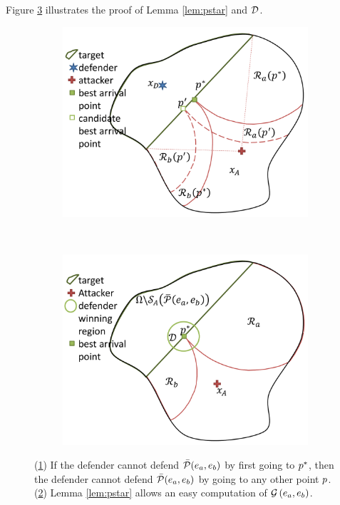 Figure \ref{fig:lemma2} illustrates the proof of Lemma \ref{lem:pstar} and $\mathcal{D}$.
\begin{figure}[h]
\centering
	\begin{subfigure}{0.24\textwidth}
	\includegraphics[width=\textwidth]{"fig/best point pstar"}
	\caption{\label{subfig:pstar}}
	\end{subfigure}~
	\begin{subfigure}{0.24\textwidth}
	\includegraphics[width=\textwidth]{"fig/defender winning pd"}
	\caption{\label{subfig:dregion}}
	\end{subfigure}
	\caption{(\ref{subfig:pstar}) If the defender cannot defend $\bar{\mathcal{P}}(e_a,e_b)$ by first going to $p^*$, then the defender cannot defend $\bar{\mathcal{P}}(e_a,e_b)$ by going to any other point $p$. (\ref{subfig:dregion}) Lemma \ref{lem:pstar} allows an easy computation of $\mathcal{G}\left(e_a,e_b\right)$.}
	\label{fig:lemma2}
\end{figure}



